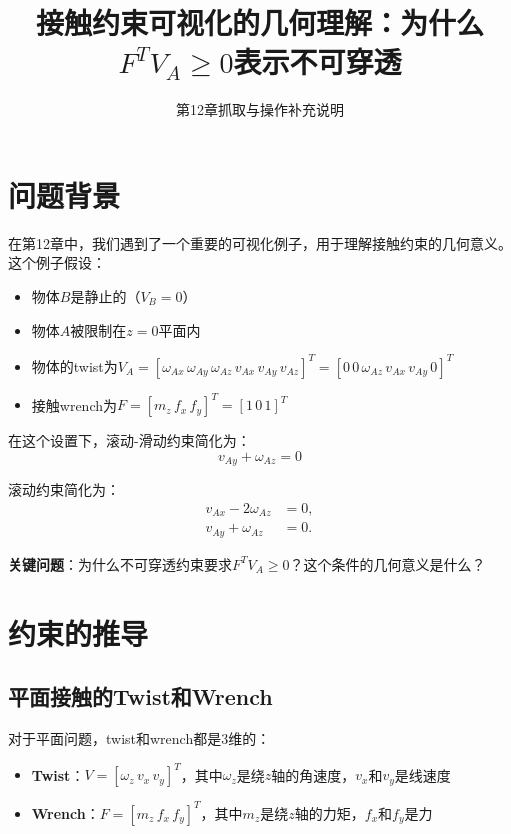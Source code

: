 \documentclass[12pt,a4paper]{article}
\title{接触约束可视化的几何理解：为什么$F^T V_A \geq 0$表示不可穿透}
\author{第12章抓取与操作补充说明}
\date{}
\begin{document}
\maketitle

\section{问题背景}

在第12章中，我们遇到了一个重要的可视化例子，用于理解接触约束的几何意义。这个例子假设：

\begin{itemize}
\item 物体$B$是静止的（$V_B = 0$）
\item 物体$A$被限制在$z = 0$平面内
\item 物体的twist为$V_A = [\omega_{Ax} \, \omega_{Ay} \, \omega_{Az} \, v_{Ax} \, v_{Ay} \, v_{Az}]^T = [0 \, 0 \, \omega_{Az} \, v_{Ax} \, v_{Ay} \, 0]^T$
\item 接触wrench为$F = [m_z \, f_x \, f_y]^T = [1 \, 0 \, 1]^T$
\end{itemize}

在这个设置下，滚动-滑动约束简化为：
\begin{equation}
v_{Ay} + \omega_{Az} = 0
\label{eq:roll_slide}
\end{equation}

滚动约束简化为：
\begin{align}
v_{Ax} - 2\omega_{Az} &= 0, \label{eq:rolling1} \\
v_{Ay} + \omega_{Az} &= 0. \label{eq:rolling2}
\end{align}

\textbf{关键问题}：为什么不可穿透约束要求$F^T V_A \geq 0$？这个条件的几何意义是什么？

\section{约束的推导}

\subsection{平面接触的Twist和Wrench}

对于平面问题，twist和wrench都是3维的：
\begin{itemize}
\item \textbf{Twist}：$V = [\omega_z \, v_x \, v_y]^T$，其中$\omega_z$是绕$z$轴的角速度，$v_x$和$v_y$是线速度
\item \textbf{Wrench}：$F = [m_z \, f_x \, f_y]^T$，其中$m_z$是绕$z$轴的力矩，$f_x$和$f_y$是力
\end{itemize}
\end{document}
